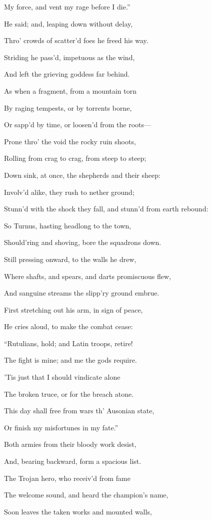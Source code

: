 My force, and vent my rage before I die.”

He said; and, leaping down without delay,

Thro’ crowds of scatter’d foes he freed his way.

Striding he pass’d, impetuous as the wind,

And left the grieving goddess far behind.

As when a fragment, from a mountain torn

By raging tempests, or by torrents borne,

Or sapp’d by time, or loosen’d from the roots—

Prone thro’ the void the rocky ruin shoots,

Rolling from crag to crag, from steep to steep;

Down sink, at once, the shepherds and their sheep:

Involv’d alike, they rush to nether ground;

Stunn’d with the shock they fall, and stunn’d from earth rebound:

So Turnus, hasting headlong to the town,

Should’ring and shoving, bore the squadrons down.

Still pressing onward, to the walls he drew,

Where shafts, and spears, and darts promiscuous flew,

And sanguine streams the slipp’ry ground embrue.

First stretching out his arm, in sign of peace,

He cries aloud, to make the combat cease:

“Rutulians, hold; and Latin troops, retire!

The fight is mine; and me the gods require.

’Tis just that I should vindicate alone

The broken truce, or for the breach atone.

This day shall free from wars th’ Ausonian state,

Or finish my misfortunes in my fate.”

Both armies from their bloody work desist,

And, bearing backward, form a spacious list.

The Trojan hero, who receiv’d from fame

The welcome sound, and heard the champion’s name,

Soon leaves the taken works and mounted walls,

